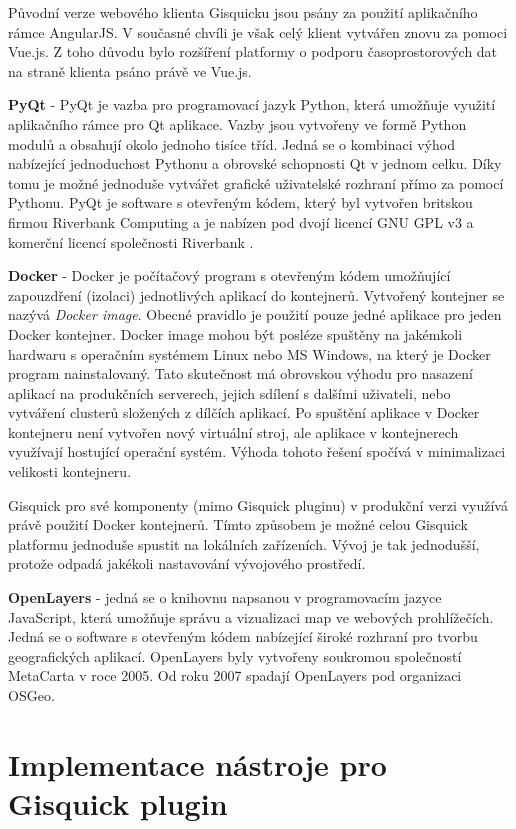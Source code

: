 Původní verze webového klienta Gisquicku jsou psány za použití
aplikačního rámce AngularJS. V současné chvíli je však celý klient
vytvářen znovu za pomoci Vue.js. Z toho důvodu bylo rozšíření platformy
o podporu časoprostorových dat na straně klienta psáno právě ve Vue.js.

\newpage
\bigskip
\noindent
\textbf{PyQt} - PyQt je vazba pro programovací jazyk Python, která umožňuje
využití aplikačního rámce pro Qt aplikace. Vazby jsou vytvořeny ve formě
Python modulů a obsahují okolo jednoho tisíce tříd. Jedná se o kombinaci
výhod nabízející jednoduchost Pythonu a obrovské schopnosti Qt v jednom
celku. Díky tomu je možné jednoduše vytvářet grafické uživatelské
rozhraní přímo za pomocí Pythonu. PyQt je software s otevřeným kódem,
který byl vytvořen britskou firmou Riverbank Computing a je nabízen pod
dvojí licencí GNU GPL v3 a komerční licencí společnosti Riverbank
\cite{pyqt}.

\bigskip
\noindent
\textbf{Docker} - Docker je počítačový program s otevřeným
kódem umožňující zapouzdření (izolaci) jednotlivých aplikací do
kontejnerů. Vytvořený kontejner se nazývá \textit{Docker image}. Obecné
pravidlo je použití pouze jedné aplikace pro jeden Docker kontejner. Docker
image mohou být posléze spuštěny na jakémkoli hardwaru s operačním
systémem Linux nebo MS Windows, na který je Docker program nainstalovaný. Tato
skutečnost má obrovskou výhodu pro nasazení aplikací na produkčních
serverech, jejich sdílení s dalšími uživateli, nebo vytváření
clusterů složených z dílčích aplikací. Po spuštění aplikace v
Docker kontejneru není vytvořen nový virtuální stroj, ale aplikace
v kontejnerech využívají hostující operační systém. Výhoda tohoto
řešení spočívá v minimalizaci velikosti kontejneru.

Gisquick pro své komponenty (mimo Gisquick pluginu) v produkční
verzi využívá právě použití Docker kontejnerů. Tímto způsobem
je možné celou Gisquick platformu jednoduše spustit na lokálních
zařízeních. Vývoj je tak jednodušší, protože odpadá jakékoli
nastavování vývojového prostředí.

\bigskip
\noindent
\textbf{OpenLayers} - jedná se o knihovnu napsanou v programovacím
jazyce JavaScript, která umožňuje správu a vizualizaci map ve webových
prohlížečích. Jedná se o software s otevřeným kódem nabízející
široké rozhraní pro tvorbu geografických aplikací. OpenLayers byly
vytvořeny soukromou společností MetaCarta v roce 2005. Od roku 2007
spadají OpenLayers pod organizaci OSGeo.

\newpage
\section{Implementace nástroje pro Gisquick plugin}


